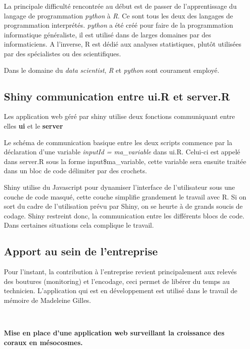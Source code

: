 \documentclass[]{report}
\begin{document}
La principale difficulté rencontrée au début est de passer de
l'apprentissage du langage de programmation \emph{python} à \emph{R}. Ce
sont tous les deux des langages de programmation interprétés.
\emph{python} a été créé pour faire de la programmation informatique
généraliste, il est utilisé dans de larges domaines par des
informaticiens. A l'inverse, R est dédié aux analyses statistiques,
plutôt utilisées par des spécialistes ou des scientifiques.

Dans le domaine du \emph{data scientist}, \emph{R} et \emph{python} sont
courament employé.

\subsection{Shiny communication entre ui.R et
server.R}\label{shiny-communication-entre-ui.r-et-server.r}

Les application web géré par shiny utilise deux fonctions communiquant
entre elles \textbf{ui} et le \textbf{server}

Le schéma de communication basique entre les deux scripts commence par
la déclaration d'une variable \emph{inputId = ma\_variable} dans ui.R.
Celui-ci est appelé dans server.R sous la forme input\$ma\_variable,
cette variable sera ensuite traitée dans un bloc de code délimiter par
des crochets.

Shiny utilise du Javascript pour dynamiser l'interface de l'utilisateur
sous une couche de code masqué, cette couche simplifie grandement le
travail avec R. Si on sort du cadre de l'utilisation prévu par Shiny, on
se heurte à de grands soucis de codage. Shiny restreint donc, la
communication entre les différents blocs de code. Dans certaines
situations cela complique le travail.

\subsection{Apport au sein de
l'entreprise}\label{apport-au-sein-de-lentreprise}

Pour l'instant, la contribution à l'entreprise revient principalement
aux relevés des boutures (monitoring) et l'encodage, ceci permet de
libérer du temps au technicien. L'application qui est en développement
est utilisé dans le travail de mémoire de Madeleine Gilles.

\begin{centering}



\textcolor{white}{.}





\vfill

\huge 
{\bf Mise en place d'une application web surveillant la croissance des coraux en mésocosmes.}

\vfill


\end {centering}
\end{document}
